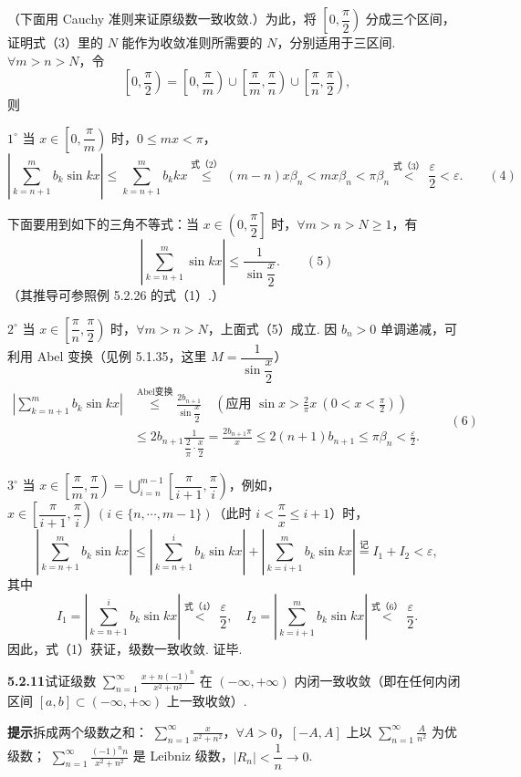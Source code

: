 \documentclass[UTF8,12pt,a4paper,fontset=fandol]{ctexart}
\begin{document}
（下面用 Cauchy 准则来证原级数一致收敛.）为此，将 $\left[0,\dfrac\pi2\right)$ 分成三个区间，证明式（3）里的
$N$ 能作为收敛准则所需要的 $N$，分别适用于三区间. $\forall m>n>N$，令
\[
  \left[0,\frac\pi2\right)=\left[0,\frac\pi m\right)\cup
  \left[\frac\pi m,\frac\pi n\right)\cup
  \left[\frac\pi n,\frac\pi2\right),
\]
则

$1^\circ$ 当 $x\in\left[0,\dfrac\pi m\right)$ 时，$0\le mx<\pi$，
\[
  \left|\sum_{k=n+1}^m b_k\sin kx\right|
  \le\sum_{k=n+1}^m b_kkx
  \overset{\text{式（2）}}{\le}(m-n)x\beta_n
  <mx\beta_n<\pi\beta_n
  \overset{\text{式（3）}}{<}\frac\varepsilon2<\varepsilon.
\qquad(4)
\]

下面要用到如下的三角不等式：当 $x\in\left(0,\dfrac\pi2\right]$ 时，$\forall m>n>N\ge1$，有
\[
  \left|\sum_{k=n+1}^m\sin kx\right|\le\frac1{\sin\dfrac x2}.
\qquad(5)
\]
（其推导可参照例 5.2.26 的式（1）.）

$2^\circ$ 当 $x\in\left[\dfrac\pi n,\dfrac\pi2\right)$ 时，$\forall m>n>N$，上面式（5）成立. 因
$b_n>0$ 单调递减，可利用 Abel 变换（见例 5.1.35，这里 $M=\dfrac1{\sin\dfrac x2}$）
\[
\begin{aligned}
\left|\sum_{k=n+1}^m b_k\sin kx\right|
&\overset{\text{Abel变换}}{\le}\frac{2b_{n+1}}{\sin\dfrac x2}
\quad\left(\text{应用 }\sin x>\frac2\pi x\ (0<x<\frac\pi2)\right)\\
&\le 2b_{n+1}\frac1{\dfrac2\pi\cdot\dfrac x2}
=\frac{2b_{n+1}\pi}{x}
\le2(n+1)b_{n+1}\le\pi\beta_n<\frac\varepsilon2.
\end{aligned}
\qquad(6)
\]

$3^\circ$ 当 $x\in\left[\dfrac\pi m,\dfrac\pi n\right)=
\displaystyle\bigcup_{i=n}^{m-1}\left[\dfrac\pi{i+1},\dfrac\pi i\right)$，例如，
$x\in\left[\dfrac\pi{i+1},\dfrac\pi i\right)\ (i\in\{n,\cdots,m-1\})$（此时
$i<\dfrac\pi x\le i+1$）时，
\[
  \left|\sum_{k=n+1}^{m}b_k\sin kx\right|
  \le\left|\sum_{k=n+1}^{i}b_k\sin kx\right|
  +\left|\sum_{k=i+1}^{m}b_k\sin kx\right|
  \overset{\text{记}}=I_1+I_2<\varepsilon,
\]
其中
\[
  I_1=\left|\sum_{k=n+1}^{i}b_k\sin kx\right|
  \overset{\text{式（4）}}{<}\frac\varepsilon2,\quad
  I_2=\left|\sum_{k=i+1}^{m}b_k\sin kx\right|
  \overset{\text{式（6）}}{<}\frac\varepsilon2.
\]
因此，式（1）获证，级数一致收敛. 证毕.

\noindent\textbf{5.2.11}\quad 试证级数
$\displaystyle\sum_{n=1}^{\infty}\frac{x+n(-1)^n}{x^2+n^2}$ 在 $(-\infty,+\infty)$ 内闭一致收敛（即在任何内闭区间
$[a,b]\subset(-\infty,+\infty)$ 上一致收敛）.

\noindent\textbf{提示}\quad 拆成两个级数之和：
$\displaystyle\sum_{n=1}^{\infty}\frac{x}{x^2+n^2}$，$\forall A>0$，$[-A,A]$ 上以
$\displaystyle\sum_{n=1}^{\infty}\frac A{n^2}$ 为优级数；
$\displaystyle\sum_{n=1}^{\infty}\frac{(-1)^nn}{x^2+n^2}$ 是 Leibniz 级数，$|R_n|<\dfrac1n\to0$.
\end{document}

